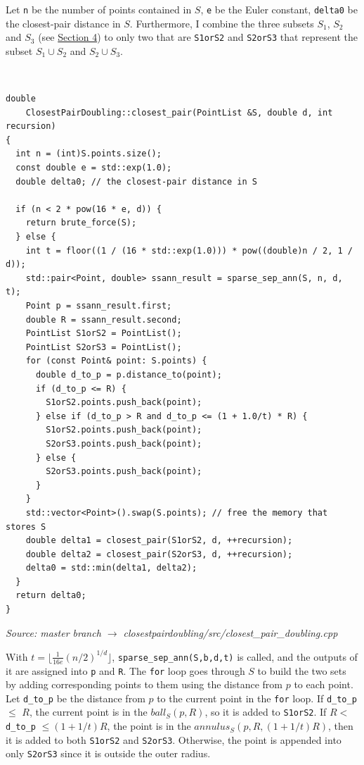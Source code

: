 \documentclass[12pt,english,]{article}
\newcommand{\code}[1]{\colorbox{light-gray}{\texttt{#1}}}
\begin{document}
Let \code{n} be the number of points contained in \(S\), \code{e} be the
Euler constant, \code{delta0} be the closest-pair distance in \(S\).
Furthermore, I combine the three subsets \(S_1\), \(S_2\) and \(S_3\)
(see \protect\hyperlink{section4}{Section 4}) to only two that are
\code{S1orS2} and \code{S2orS3} that represent the subset
\(S_1 \cup S_2\) and \(S_2 \cup S_3\).

~

\begin{lstlisting}
double
    ClosestPairDoubling::closest_pair(PointList &S, double d, int recursion)
{
  int n = (int)S.points.size();
  const double e = std::exp(1.0);
  double delta0; // the closest-pair distance in S

  if (n < 2 * pow(16 * e, d)) {
    return brute_force(S);
  } else {
    int t = floor((1 / (16 * std::exp(1.0))) * pow((double)n / 2, 1 / d));
    std::pair<Point, double> ssann_result = sparse_sep_ann(S, n, d, t);
    Point p = ssann_result.first;
    double R = ssann_result.second;
    PointList S1orS2 = PointList();
    PointList S2orS3 = PointList();
    for (const Point& point: S.points) {
      double d_to_p = p.distance_to(point);
      if (d_to_p <= R) {
        S1orS2.points.push_back(point);
      } else if (d_to_p > R and d_to_p <= (1 + 1.0/t) * R) {
        S1orS2.points.push_back(point);
        S2orS3.points.push_back(point);
      } else {
        S2orS3.points.push_back(point);
      }
    }
    std::vector<Point>().swap(S.points); // free the memory that stores S
    double delta1 = closest_pair(S1orS2, d, ++recursion);
    double delta2 = closest_pair(S2orS3, d, ++recursion);
    delta0 = std::min(delta1, delta2);
  }
  return delta0;
}
\end{lstlisting}
\vspace{-9truemm}
\begin{minipage}{1\textwidth}
  \begin{flushright}
  {\footnotesize \emph{Source: master branch $\rightarrow$ closestpairdoubling/src/closest\_pair\_doubling.cpp}\par}
  \end{flushright}
\end{minipage}
\vspace{0.5truemm}

With \(t = \lfloor \frac{1}{16e}(n/2)^{1/d}\rfloor\),
\code{sparse\_sep\_ann(S,b,d,t)} is called, and the outputs of it are
assigned into \code{p} and \code{R}. The \code{for} loop goes through
\(S\) to build the two sets by adding corresponding points to them using
the distance from \(p\) to each point. Let \code{d\_to\_p} be the
distance from \(p\) to the current point in the \code{for} loop. If
\code{d\_to\_p} \(\leq\) \(R\), the current point is in the
\(ball_S(p, R)\), so it is added to \code{S1orS2}. If \(R <\)
\code{d\_to\_p} \(\leq (1 + 1/t)R\), the point is in the
\(annulus_S(p, R, (1+1/t)R)\), then it is added to both \code{S1orS2}
and \code{S2orS3}. Otherwise, the point is appended into only
\code{S2orS3} since it is outside the outer radius.
\end{document}
